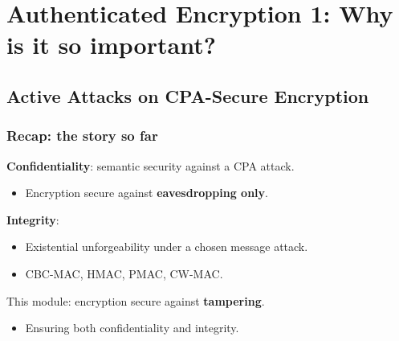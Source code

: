 \documentclass[12pt]{book}
\begin{document}
\section{Authenticated Encryption 1: Why is it so important?}
\subsection{Active Attacks on CPA-Secure Encryption}
\subsubsection{Recap: the story so far}
\textbf{Confidentiality}: semantic security against a CPA attack.
\begin{itemize}
	\item Encryption secure against \textbf{eavesdropping only}.
\end{itemize}

\textbf{Integrity}:
\begin{itemize}
	\item Existential unforgeability under a chosen message attack.
	\item CBC-MAC, HMAC, PMAC, CW-MAC.
\end{itemize}

This module: encryption secure against \textbf{tampering}.
\begin{itemize}
	\item Ensuring both confidentiality and integrity.
\end{itemize}
\end{document}

